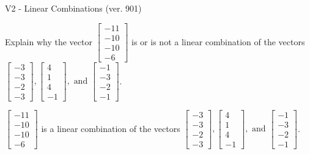 \begin{exercise}
  \begin{exerciseTitle}V2 - Linear Combinations (ver. 901)\end{exerciseTitle}
  \begin{exerciseStatement}
    Explain why the vector \(\left[\begin{array}{c}
-11 \\
-10 \\
-10 \\
-6
\end{array}\right]\)  is or is not a linear 
	combination of the vectors \(\left[\begin{array}{c}
-3 \\
-3 \\
-2 \\
-3
\end{array}\right] , \left[\begin{array}{c}
4 \\
1 \\
4 \\
-1
\end{array}\right] , \text{ and } \left[\begin{array}{c}
-1 \\
-3 \\
-2 \\
-1
\end{array}\right]\).
	


  \end{exerciseStatement}
  \begin{exerciseAnswer}
   \(\left[\begin{array}{c}
-11 \\
-10 \\
-10 \\
-6
\end{array}\right]\) 
  	 is  
	a linear combination of the vectors \(\left[\begin{array}{c}
-3 \\
-3 \\
-2 \\
-3
\end{array}\right] , \left[\begin{array}{c}
4 \\
1 \\
4 \\
-1
\end{array}\right] , \text{ and } \left[\begin{array}{c}
-1 \\
-3 \\
-2 \\
-1
\end{array}\right]\).

	
  


  \end{exerciseAnswer}
\end{exercise}